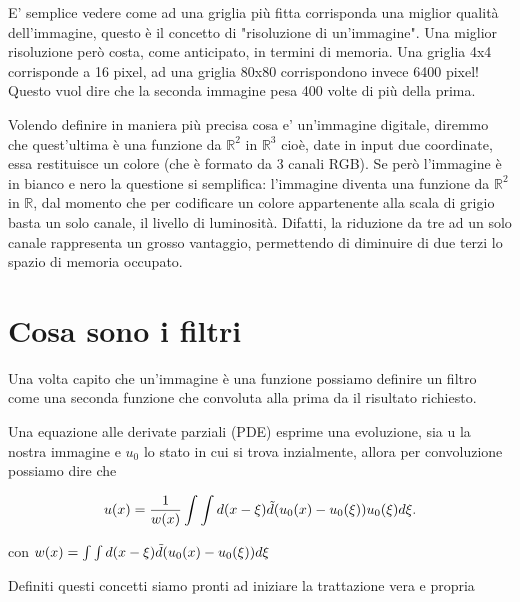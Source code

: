 \noindent
E' semplice vedere come ad una griglia più fitta corrisponda una miglior qualità dell'immagine, questo è il concetto di "risoluzione di un'immagine". 
Una miglior risoluzione però costa, come anticipato, in termini di memoria. Una griglia 4x4 corrisponde a 16 pixel, ad una griglia 80x80 corrispondono invece 6400 pixel! Questo vuol dire che la seconda immagine pesa 400 volte di più della prima.

\vspace{1em} \noindent
Volendo definire in maniera più precisa cosa e' un'immagine digitale, diremmo che quest'ultima è una funzione da $\mathbb R^2$ in $\mathbb R^3$ cioè, date in input due coordinate, essa restituisce un colore (che è formato da 3 canali RGB). Se però l'immagine è in bianco e nero la questione si semplifica: l'immagine diventa una funzione da $\mathbb R^2$ in $\mathbb R$, dal momento che per codificare un colore appartenente alla scala di grigio basta un solo canale, il livello di luminosità. Difatti, la riduzione da tre ad un solo canale rappresenta un grosso vantaggio, permettendo di diminuire di due terzi lo spazio di memoria occupato.

\section{Cosa sono i filtri}
Una volta capito che un'immagine è una funzione possiamo definire un filtro come una seconda funzione che convoluta alla prima da il risultato richiesto.

\noindent
Una equazione alle derivate parziali (PDE) esprime una evoluzione, sia u la nostra immagine e $u_0$ lo stato in cui si trova inzialmente, allora per convoluzione possiamo dire che 

\begin{equation} \label{eq:eq3}
u(x)=\frac{1}{w(x)}\int\int d(x-\xi)\Tilde{d}(u_0(x) -u_0(\xi))u_0(\xi)d\xi.
\end{equation}

\centering con  $w(x) = \int\int d(x-\xi)\Tilde{d}(u_0(x) -u_0(\xi))d\xi$\newline

\raggedright

Definiti questi concetti siamo pronti ad iniziare la trattazione vera e propria

